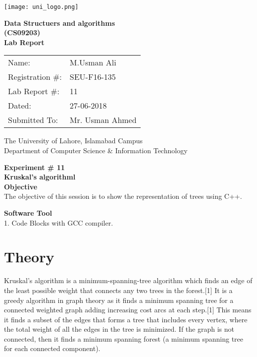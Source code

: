 \documentclass[11pt]{article}            %
\begin{document}
\begin{titlepage}
    \centering
  \vfill
    \texttt{[image: uni\_logo.png]} \\ 
	\vskip2cm
    {\bfseries\Large
	Data Structuers and algorithms \\ (CS09203)\\
	
	\vskip2cm
	Lab Report 
	 
	\vskip2cm
	}    

\begin{center}
\begin{tabular}{ l l  } 

Name: & M.Usman Ali\\ 
Registration \#: & SEU-F16-135 \\ 
Lab Report \#: & 11 \\ 
 Dated:& 27-06-2018\\ 
Submitted To:& Mr. Usman Ahmed\\ 

\end{tabular}
\end{center}
    \vfill
    The University of Lahore, Islamabad Campus\\
Department of Computer Science \& Information Technology
\end{titlepage}


    
    {\bfseries\Large
\centering
	Experiment \# 11 \\

Kruskal's algorithml \\
	
	}    
 \vskip1cm
 \textbf {Objective}\\ The objective of this session is to show the representation of trees using C++. 
 
 \textbf {Software Tool} \\
 1. Code Blocks with GCC compiler.

\section{Theory }              

Kruskal's algorithm is a minimum-spanning-tree algorithm which finds an edge of the least possible weight that connects any two trees in the forest.[1] It is a greedy algorithm in graph theory as it finds a minimum spanning tree for a connected weighted graph adding increasing cost arcs at each step.[1] This means it finds a subset of the edges that forms a tree that includes every vertex, where the total weight of all the edges in the tree is minimized. If the graph is not connected, then it finds a minimum spanning forest (a minimum spanning tree for each connected component).
\end{document}
